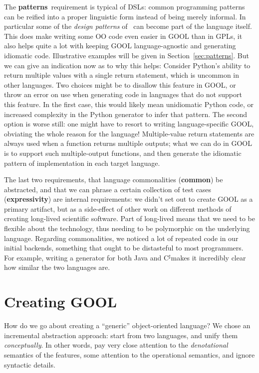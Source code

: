 \documentclass[sigplan,review,anonymous,prologue,dvipsnames]{acmart}
\newcommand{\Csharp}{C$^{\sharp}$}
\newcommand{\abbrev}[1]{\textbf{#1}}
\newcommand{\oopatterns}{\abbrev{patterns}}
\newcommand{\common}{\abbrev{common}}
\newcommand{\expressivity}{\abbrev{expressivity}}
\begin{document}
The \oopatterns~requirement is typical of DSLs: common programming patterns
can be reified into a proper linguistic form instead of being merely
informal. In particular some of the \emph{design patterns} of~\cite{gamma1995design}
can become part of the language itself. This does make writing some OO
code even easier in GOOL than in GPLs, it also helps quite a lot with
keeping GOOL language-agnostic and generating idiomatic code. Illustrative
examples will be given in Section~\ref{sec:patterns}.  But we can give an
indication now as to why this helps: Consider Python's
ability to return multiple values with a single return statement, which
is uncommon in other languages.  Two choices might be to disallow this
feature in GOOL, or throw an error on use when generating code in languages
that do not support this feature. In the first case, this would likely mean
unidiomatic Python code, or increased complexity in the Python generator to
infer that pattern. The second option is worse still: one might have to resort
to writing language-specific GOOL, obviating the whole reason for the language!
Multiple-value return statements are always used when a function returns multiple
outputs; what we can do in GOOL is to support such multiple-output functions,
and
then generate the idiomatic pattern of implementation in each target language.

The last two requirements, that language commonalities (\common) be abstracted,
and that we can phrase a certain collection of test cases (\expressivity) are
internal requirements: we didn't set out to create GOOL as a primary artifact,
but as a side-effect of other work on different methods of creating long-lived
scientific software.  Part of long-lived means that we need to be flexible about
the technology, thus needing to be polymorphic on the underlying language.
Regarding commonalities, we noticed a lot of repeated code in our initial
backends, something that ought to be distasteful to most programmers. For
example, writing a generator for both Java and \Csharp makes it incredibly
clear how similar the two languages are.

\section{Creating GOOL} \label{sec:creating}

How do we go about creating a ``generic'' object-oriented language?
We chose an incremental abstraction approach: start from two languages,
and unify them \emph{conceptually}.  In other words, pay very close
attention to the \emph{denotational} semantics of the features, some
attention to the operational semantics, and ignore syntactic details.
\end{document}

